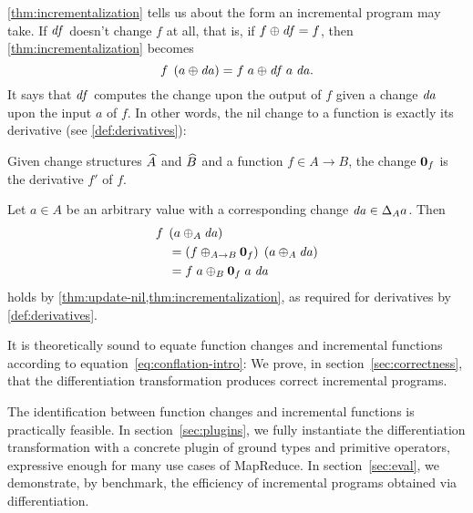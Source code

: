 \cref{thm:incrementalization} tells us about the form an
incremental program may take. If $\mathit{df}$ doesn't change $f$
at all, that is, if
$
\Apply{\D f}{f}= f
$,
then \cref{thm:incrementalization} becomes
\[
 \App {f} {\Apply* {\D a} {a}}
 =
\Apply {\App {\App {\D f} {a}} {\D a}} {\App{f}{a}}.
\]
It says that $\mathit{df}$ computes the change upon the output of $f$ 
given a change $\mathit{da}$ upon the input $a$ of $f$. In
other words, the nil change to a function is exactly its
derivative (see \cref{def:derivatives}):


\begin{theorem}
  \label{thm:nil-is-derivative}
  Given change structures $\widehat{A}$ and $\widehat{B}$ and a function $f \in A \to B$,
  the change $\NilC[A \to B]{f}$ is the derivative $f'$ of $f$.
\end{theorem}

\begin{optionalproof}
  Let $a \in A$ be an arbitrary value with a corresponding change
  $\D a \in \Change[A]{a}$. Then
  \begin{align*}
    & \App{f}{\Apply*[A]{\D a}{a}}\\
    & \quad = \App{\Apply*[A \to B]{\NilC[A \to B]{f}}{f}}{\Apply*[A]{\D a}{a}}\\
    & \quad = \Apply[B]{\App{\App{\NilC[A]{f}}{a}}{\D a}}{\App{f}{a}}
  \end{align*}
  holds by \cref{thm:update-nil,thm:incrementalization}, as
  required for derivatives by \cref{def:derivatives}.
\end{optionalproof}

\begin{oldSec}

It is theoretically sound to equate function changes and
incremental functions according to
equation~\ref{eq:conflation-intro}: We prove, in
section~\ref{sec:correctness}, that the differentiation
transformation produces correct incremental programs.

The identification between function changes and incremental functions
is practically feasible. In section~\ref{sec:plugins}, we fully
instantiate the differentiation transformation with a concrete
plugin of ground types and primitive operators, expressive enough
for many use cases of MapReduce. In section~\ref{sec:eval}, we
demonstrate, by benchmark, the efficiency of incremental programs
obtained via differentiation.


\end{oldSec}


